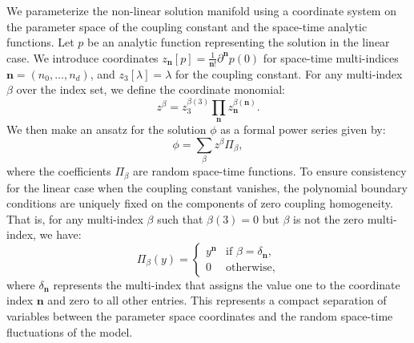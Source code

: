 We parameterize the non-linear solution manifold using a coordinate system on the parameter space of the coupling constant and the space-time analytic functions. Let $p$ be an analytic function representing the solution in the linear case. We introduce coordinates $z_\textbf{n}[p] = \frac{1}{\textbf{n}!} \partial^\textbf{n} p(0)$ for space-time multi-indices $\textbf{n} = (n_0, \dots, n_d)$, and $z_3[\lambda] = \lambda$ for the coupling constant. For any multi-index $\beta$ over the index set, we define the coordinate monomial:
\begin{equation}
z^\beta = z_3^{\beta(3)} \prod_{\textbf{n}} z_\textbf{n}^{\beta(\textbf{n})}.
\end{equation}
We then make an ansatz for the solution $\phi$ as a formal power series given by:
\begin{equation}
\phi = \sum_{\beta} z^\beta \Pi_\beta,
\end{equation}
where the coefficients $\Pi_\beta$ are random space-time functions. To ensure consistency for the linear case when the coupling constant vanishes, the polynomial boundary conditions are uniquely fixed on the components of zero coupling homogeneity. 
That is, for any multi-index $\beta$ such that $\beta(3) = 0$ but $\beta$ is not the zero multi-index, we have:
\begin{equation}
\Pi_\beta(y) = \begin{cases} y^\textbf{n} & \text{if } \beta = \delta_\textbf{n}, \\ 0 & \text{otherwise}, \end{cases}
\end{equation}
where $\delta_\textbf{n}$ represents the multi-index that assigns the value one to the coordinate index $\textbf{n}$ and zero to all other entries. This represents a compact separation of variables between the parameter space coordinates and the random space-time fluctuations of the model.


